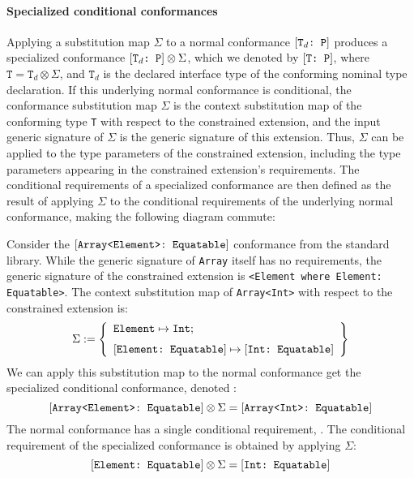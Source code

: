 \documentclass[../generics]{subfiles}
\begin{document}
\paragraph{Specialized conditional conformances}
Applying a substitution map $\Sigma$ to a normal conformance $[\texttt{$\texttt{T}_d$:~P}]$ produces a specialized conformance $[\texttt{$\texttt{T}_d$:~P}]\otimes\Sigma$, which we denoted by $[\texttt{T:~P}]$, where $\texttt{T}=\texttt{T}_d\otimes\Sigma$, and $\texttt{T}_d$ is the declared interface type of the conforming nominal type declaration. If this underlying normal conformance is conditional, the conformance substitution map $\Sigma$ is the context substitution map of the conforming type \texttt{T} with respect to the constrained extension, and the input generic signature of $\Sigma$ is the generic signature of this extension. Thus, $\Sigma$ can be applied to the type parameters of the constrained extension, including the type parameters appearing in the constrained extension's requirements. The conditional requirements of a specialized conformance are then defined as the result of applying $\Sigma$ to the conditional requirements of the underlying normal conformance, making the following diagram commute:
\begin{quote}
\newcommand{\GetConditionalRequirements}{\def\arraystretch{0.65}\arraycolsep=0pt\begin{array}{c}\text{get conditional}\\\text{requirements}\end{array}}
\end{quote}

Consider the $[\texttt{Array<Element>:~Equatable}]$ conformance from the standard library. While the generic signature of \texttt{Array} itself has no requirements, the generic signature of the constrained extension is \verb|<Element where Element: Equatable>|. The context substitution map of \texttt{Array<Int>} with respect to the constrained extension is:
\[\Sigma := \SubstMapLongC{\SubstType{Element}{Int}}{\SubstConf{Element}{Int}{Equatable}}\]
We can apply this substitution map to the normal conformance get the specialized conditional conformance, denoted :
\[
[\texttt{Array<Element>:~Equatable}] \otimes \Sigma = [\texttt{Array<Int>:~Equatable}]
\]
The normal conformance has a single conditional requirement, . The conditional requirement of the specialized conformance is obtained by applying $\Sigma$:
\[
[\texttt{Element:~Equatable}] \otimes \Sigma = [\texttt{Int:~Equatable}]
\]
\end{document}
